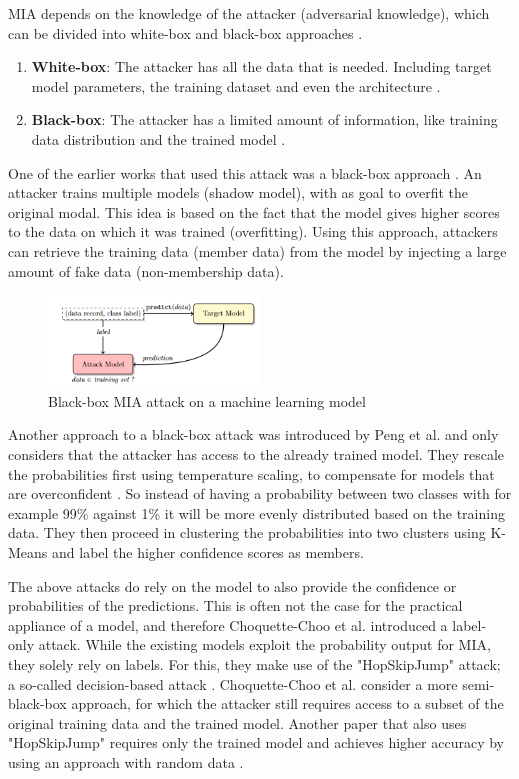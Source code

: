MIA depends on the knowledge of the attacker (adversarial knowledge), which can be divided into white-box and black-box approaches \citep{hu_membership_2022}.
\begin{enumerate}
  \item \textbf{White-box}: The attacker has all the data that is needed. Including target model parameters, the training dataset and even the architecture \citep{hu_membership_2022}.
  \item \textbf{Black-box}: The attacker has a limited amount of information, like training data distribution and the trained model \citep{hu_membership_2022}.
\end{enumerate}
One of the earlier works that used this attack was a black-box approach \citep{shokri_membership_2017}.
An attacker trains multiple models (shadow model), with as goal to overfit the original modal.
This idea is based on the fact that the model gives higher scores to the data on which it was trained (overfitting).
Using this approach, attackers can retrieve the training data (member data) from the model by injecting a large amount of fake data (non-membership data).
\begin{figure}[H]
  \includegraphics[width=0.5\textwidth]{TheorethicalFramework/AttacksOnPrivacy/shadow-models-mi.png}
  \caption{Black-box MIA attack on a machine learning model \citep{shokri_membership_2017}}
\end{figure}
Another approach to a black-box attack was introduced by Peng et al. and only considers that the attacker has access to the already trained model.
They rescale the probabilities first using temperature scaling, to compensate for models that are overconfident \citep{peng_unsupervised_nodate}.
So instead of having a probability between two classes with for example 99\% against 1\% it will be more evenly distributed based on the training data.
They then proceed in clustering the probabilities into two clusters using K-Means and label the higher confidence scores as members.

The above attacks do rely on the model to also provide the confidence or probabilities of the predictions.
This is often not the case for the practical appliance of a model, and therefore Choquette-Choo et al. introduced a label-only attack.
While the existing models exploit the probability output for MIA, they solely rely on labels.
For this, they make use of the "HopSkipJump" attack; a so-called decision-based attack \citep{chen_hopskipjumpattack_2020}.
Choquette-Choo et al. consider a more semi-black-box approach, for which the attacker still requires access to a subset of the original training data and the trained model.
Another paper that also uses "HopSkipJump" requires only the trained model and achieves higher accuracy by using an approach with random data \citep{li_membership_2021}. \newline

